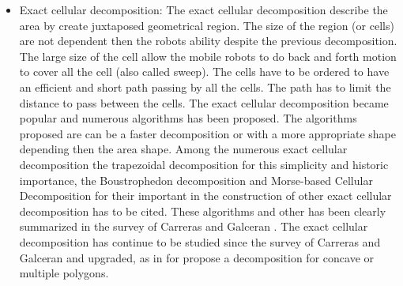 \begin{itemize}
	\item Exact cellular decomposition: 
	The exact cellular decomposition describe the area by create juxtaposed geometrical region. The size of the region (or cells) are not dependent then the robots ability despite the previous decomposition. The large size of the cell allow the  mobile robots to do back and forth motion to cover all the cell (also called sweep).  The cells have to be ordered to have an efficient and short path passing by all the cells. The path has to limit the distance to pass  between the cells.
	The exact cellular decomposition became popular and numerous algorithms has been proposed. The algorithms proposed are can be a faster decomposition or with a more appropriate shape depending then the area shape. 
	Among the numerous exact cellular decomposition the trapezoidal decomposition for this simplicity and historic importance, the Boustrophedon decomposition  and  Morse-based Cellular Decomposition for their important in the construction of other exact cellular decomposition has to be cited. These algorithms and other has been clearly summarized in the survey of Carreras and Galceran \citep{66*galceran2013}. 
	The exact cellular decomposition has continue to be studied since the survey of  Carreras and Galceran  \citep{66*galceran2013} and upgraded, as in   \cite{144*torres2016} for propose a decomposition for concave or multiple polygons.
	
\end{itemize}




% 

 
